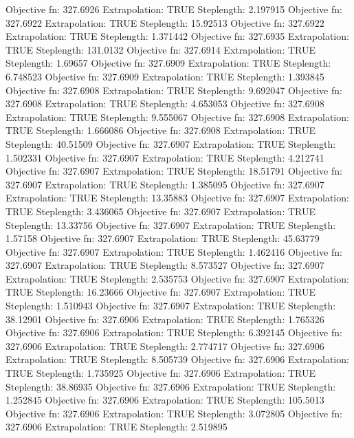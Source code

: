 \documentclass{article}
\begin{document}
\begin{Schunk}
\begin{Soutput}
Objective fn:  327.6926   Extrapolation:  TRUE   Steplength:  2.197915 
Objective fn:  327.6922   Extrapolation:  TRUE   Steplength:  15.92513 
Objective fn:  327.6922   Extrapolation:  TRUE   Steplength:  1.371442 
Objective fn:  327.6935   Extrapolation:  TRUE   Steplength:  131.0132 
Objective fn:  327.6914   Extrapolation:  TRUE   Steplength:  1.69657 
Objective fn:  327.6909   Extrapolation:  TRUE   Steplength:  6.748523 
Objective fn:  327.6909   Extrapolation:  TRUE   Steplength:  1.393845 
Objective fn:  327.6908   Extrapolation:  TRUE   Steplength:  9.692047 
Objective fn:  327.6908   Extrapolation:  TRUE   Steplength:  4.653053 
Objective fn:  327.6908   Extrapolation:  TRUE   Steplength:  9.555067 
Objective fn:  327.6908   Extrapolation:  TRUE   Steplength:  1.666086 
Objective fn:  327.6908   Extrapolation:  TRUE   Steplength:  40.51509 
Objective fn:  327.6907   Extrapolation:  TRUE   Steplength:  1.502331 
Objective fn:  327.6907   Extrapolation:  TRUE   Steplength:  4.212741 
Objective fn:  327.6907   Extrapolation:  TRUE   Steplength:  18.51791 
Objective fn:  327.6907   Extrapolation:  TRUE   Steplength:  1.385095 
Objective fn:  327.6907   Extrapolation:  TRUE   Steplength:  13.35883 
Objective fn:  327.6907   Extrapolation:  TRUE   Steplength:  3.436065 
Objective fn:  327.6907   Extrapolation:  TRUE   Steplength:  13.33756 
Objective fn:  327.6907   Extrapolation:  TRUE   Steplength:  1.57158 
Objective fn:  327.6907   Extrapolation:  TRUE   Steplength:  45.63779 
Objective fn:  327.6907   Extrapolation:  TRUE   Steplength:  1.462416 
Objective fn:  327.6907   Extrapolation:  TRUE   Steplength:  8.573527 
Objective fn:  327.6907   Extrapolation:  TRUE   Steplength:  2.535753 
Objective fn:  327.6907   Extrapolation:  TRUE   Steplength:  16.23666 
Objective fn:  327.6907   Extrapolation:  TRUE   Steplength:  1.510943 
Objective fn:  327.6907   Extrapolation:  TRUE   Steplength:  38.12901 
Objective fn:  327.6906   Extrapolation:  TRUE   Steplength:  1.765326 
Objective fn:  327.6906   Extrapolation:  TRUE   Steplength:  6.392145 
Objective fn:  327.6906   Extrapolation:  TRUE   Steplength:  2.774717 
Objective fn:  327.6906   Extrapolation:  TRUE   Steplength:  8.505739 
Objective fn:  327.6906   Extrapolation:  TRUE   Steplength:  1.735925 
Objective fn:  327.6906   Extrapolation:  TRUE   Steplength:  38.86935 
Objective fn:  327.6906   Extrapolation:  TRUE   Steplength:  1.252845 
Objective fn:  327.6906   Extrapolation:  TRUE   Steplength:  105.5013 
Objective fn:  327.6906   Extrapolation:  TRUE   Steplength:  3.072805 
Objective fn:  327.6906   Extrapolation:  TRUE   Steplength:  2.519895 

\end{Soutput}
\end{Schunk}
\end{document}
